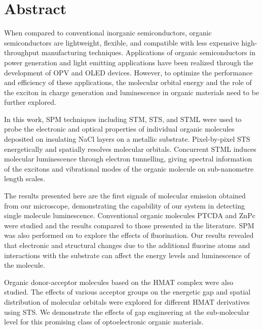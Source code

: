 


\chapter{Abstract}


When compared to conventional inorganic semiconductors, organic semiconductors are lightweight, flexible, and compatible with less expensive high-throughput manufacturing techniques. Applications of organic semiconductors in power generation and light emitting applications have been realized through the development of \ac{OPV} and \ac{OLED} devices. However, to optimize the performance and efficiency of these applications, the molecular orbital energy and the role of the exciton in charge generation and luminescence in organic materials need to be further explored.

In this work, \ac{SPM} techniques including \ac{STM}, \ac{STS}, and \ac{STML} were used to probe the electronic and optical properties of individual organic molecules deposited on insulating NaCl layers on a metallic substrate. Pixel-by-pixel \ac{STS} energetically and spatially resolves molecular orbitals. Concurrent \ac{STML} induces molecular luminescence through electron tunnelling, giving spectral information of the excitons and vibrational modes of the organic molecule on sub-nanometre length scales.

\sloppy The results presented here are the first signals of molecular emission obtained from our microscope, demonstrating the capability of our system in detecting single molecule luminescence.  Conventional organic molecules \ac{PTCDA} and \ac{ZnPc} were studied and the results compared to those presented in the literature. \ac{SPM} was also performed on  to explore the effects of fluorination. Our results revealed that electronic and structural changes due to the additional fluorine atoms and interactions with the substrate can affect the energy levels and luminescence of the molecule.

\sloppy Organic donor-acceptor molecules based on the \ac{HMAT} complex were also studied. The effects of various acceptor groups on the energetic gap and spatial distribution of molecular orbitals were explored for different \ac{HMAT} derivatives using \ac{STS}. We demonstrate the effects of gap engineering at the sub-molecular level for this promising class of optoelectronic organic materials.










\vfill
\begin{center}
\begin{sf}
\end{sf}
\end{center}
